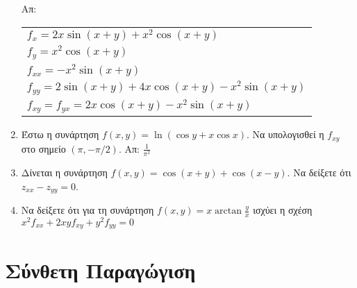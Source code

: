\begin{enumerate}
    \hfill Απ: \begin{tabular}{l}
      $ f_{x} = 2x \sin{(x+y)} + x^{2} \cos{(x+y)} $ \\
      $ f_{y} = x^{2} \cos{(x+y)} $ \\
      $ f_{xx} =  -x^{2} \sin{(x+y)} $ \\
      $ f_{yy} = 2 \sin{(x+y)} + 4x \cos{(x+y)} -x^{2} \sin{(x+y)} $ \\
      $ f_{xy}=f_{yx} =  2x \cos{(x+y)} -x^{2} \sin{(x+y)} $
    \end{tabular}

  \item Έστω η συνάρτηση $f(x,y)=\ln\left(\cos y+x\cos x\right)$.  Να υπολογισθεί 
    η $ f_{xy} $ στο σημείο $(\pi,-\pi/2)$.  \hfill Απ: $\frac{1}{\pi^2}$



  \item  Δίνεται η συνάρτηση $ f(x,y) = \cos{(x+y)} + \cos{(x-y)} $. Να δείξετε ότι  
    $ z_{xx} - z_{yy} = 0 $.

  \item Να δείξετε ότι για τη συνάρτηση $ f(x,y) = x \arctan{\frac{y}{x}} $ 
    ισχύει η σχέση $ x^{2} f_{xx} + 2xyf_{xy} + y^{2} f_{yy} = 0 $ 
\end{enumerate}


\section*{Σύνθετη Παραγώγιση}

